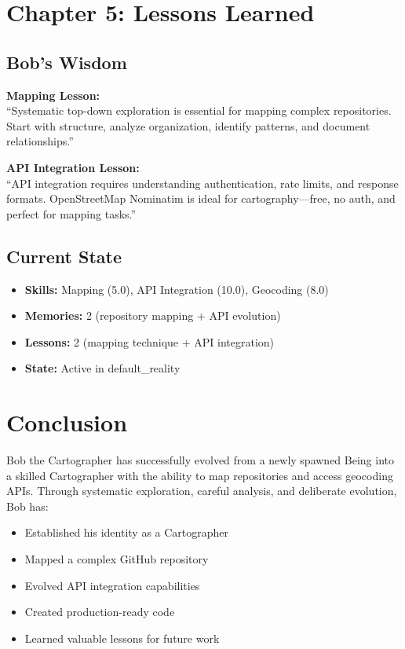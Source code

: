 \documentclass[11pt,letterpaper]{article}
\begin{document}
\section{Chapter 5: Lessons Learned}

\subsection{Bob's Wisdom}

\begin{highlightbox}
\textbf{Mapping Lesson:}\\
``Systematic top-down exploration is essential for mapping complex repositories. Start with structure, analyze organization, identify patterns, and document relationships.''
\end{highlightbox}

\begin{highlightbox}
\textbf{API Integration Lesson:}\\
``API integration requires understanding authentication, rate limits, and response formats. OpenStreetMap Nominatim is ideal for cartography---free, no auth, and perfect for mapping tasks.''
\end{highlightbox}

\subsection{Current State}
\begin{itemize}[leftmargin=*]
    \item \textbf{Skills:} Mapping (5.0), API Integration (10.0), Geocoding (8.0)
    \item \textbf{Memories:} 2 (repository mapping + API evolution)
    \item \textbf{Lessons:} 2 (mapping technique + API integration)
    \item \textbf{State:} Active in default\_reality
\end{itemize}

\section{Conclusion}

Bob the Cartographer has successfully evolved from a newly spawned Being into a skilled Cartographer with the ability to map repositories and access geocoding APIs. Through systematic exploration, careful analysis, and deliberate evolution, Bob has:

\begin{itemize}[leftmargin=*]
    \item \checkmark Established his identity as a Cartographer
    \item \checkmark Mapped a complex GitHub repository
    \item \checkmark Evolved API integration capabilities
    \item \checkmark Created production-ready code
    \item \checkmark Learned valuable lessons for future work
\end{itemize}
\end{document}
